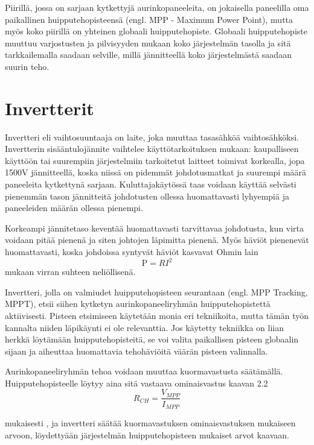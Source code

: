   Piirillä, jossa on sarjaan kytkettyjä aurinkopaneeleita, on jokaisella paneelilla oma paikallinen huipputehopisteensä (engl. MPP - Maximum Power Point), mutta myös koko piirillä on yhteinen globaali huipputehopiste. Globaali huipputehopiste muuttuu varjostusten ja pilvisyyden mukaan koko järjestelmän tasolla ja sitä tarkkailemalla saadaan selville, millä jännitteellä koko järjestelmästä saadaan suurin teho.

\section{Invertterit}
  Invertteri eli vaihtosuuntaaja on laite, joka muuttaa tasasähköä vaihtosähköksi. Invertterin sisääntulojännite vaihtelee käyttötarkoituksen mukaan: kaupalliseen käyttöön tai suurempiin järjestelmiin tarkoitetut laitteet toimivat korkealla, jopa 1500V jännitteellä, koska niissä on pidemmät johdotusmatkat ja suurempi määrä paneeleita kytkettynä sarjaan. Kuluttajakäytössä taas voidaan käyttää selvästi pienemmän tason jännitteitä johdotusten ollessa huomattavasti lyhyempiä ja paneeleiden määrän ollessa pienempi.

  Korkeampi jännitetaso keventää huomattavasti tarvittavaa johdotusta, kun virta voidaan pitää pienenä ja siten johtojen läpimitta pienenä. Myös häviöt pienenevät huomattavasti, koska johdoissa syntyvät häviöt kasvavat Ohmin lain
  \begin{equation}
    \textrm{P} = RI^2
  \end{equation}
  mukaan virran suhteen neliöllisenä.

  Invertteri, jolla on valmiudet huipputehopisteen seurantaan (engl. MPP Tracking, MPPT), etsii siihen kytketyn aurinkopaneeliryhmän huipputehopistettä aktiivisesti. Pisteen etsimiseen käytetään monia eri tekniikoita, mutta tämän työn kannalta niiden läpikäynti ei ole relevanttia. Jos käytetty tekniikka on liian herkkä löytämään huipputehopisteitä, se voi valita paikallisen pisteen globaalin sijaan ja aiheuttaa huomattavia tehohäviöitä väärän pisteen valinnalla. \parencite{Joshi&Arora}

  Aurinkopaneeliryhmän tehoa voidaan muuttaa kuormavastusta säätämällä. Huipputehopisteelle löytyy aina sitä vastaava ominaisvastus kaavan 2.2
  \begin{equation}
    R_{CH} = \frac{V_{MPP}}{I_{MPP}}
  \end{equation}

  mukaisesti \parencite{Joshi&Arora}, ja invertteri säätää kuormavastuksen ominaisvastuksen mukaiseen arvoon, löydettyään järjestelmän huipputehopisteen mukaiset arvot kaavaan.

